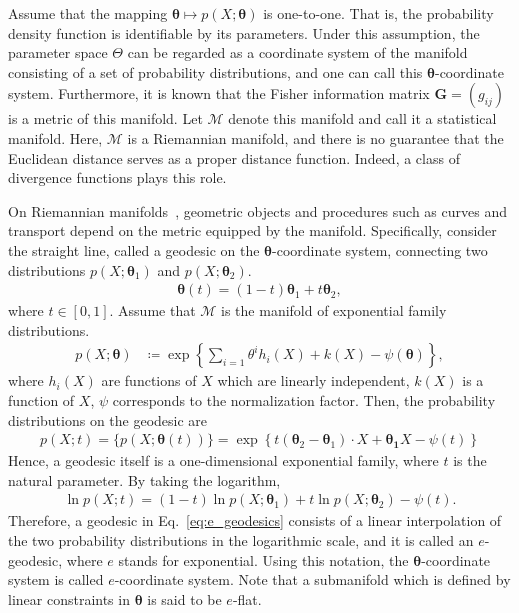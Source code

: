 \documentclass[12pt]{article}
\begin{document}
Assume that the mapping $\bm{\theta} \mapsto p(X; \bm{\theta})$ is one-to-one.
That is, the probability density function is identifiable by its parameters.
Under this assumption, the parameter space $\Theta$ can be regarded as a coordinate system of the manifold consisting of a set of probability distributions, and one can call this $\bm{\theta}$-coordinate system.
Furthermore, it is known that the Fisher information matrix $\bm{G} = (g_{ij})$ is a metric of this manifold.
Let $\mathcal{M}$ denote this manifold and call it a statistical manifold.
Here, $\mathcal{M}$ is a Riemannian manifold, and there is no guarantee that the Euclidean distance serves as a proper distance function.
Indeed, a class of divergence functions plays this role.

On Riemannian manifolds~\citep{lee2018introduction,lang1995differential}, geometric objects and procedures such as curves and transport depend on the metric equipped by the manifold.
Specifically, consider the straight line, called a geodesic on the $\bm{\theta}$-coordinate system, connecting two distributions $p(X; \bm{\theta}_1)$ and $p(X; \bm{\theta}_2)$.
\begin{align}
    \bm{\theta}(t) = (1 - t)\bm{\theta}_1 + t \bm{\theta}_2, \label{eq:e_geodesics}
\end{align}
where $t \in [0, 1]$.
Assume that $\mathcal{M}$ is the manifold of exponential family distributions.
\begin{align*}
    p(X; \bm{\theta}) &\coloneqq \exp\left\{\sum_{i=1}\theta^i h_i(X) + k(X) - \psi(\bm{\theta}) \right\},
\end{align*}
where $h_i(X)$ are functions of $X$ which are linearly independent, $k(X)$ is a function of $X$, $\psi$ corresponds to the normalization factor.
Then, the probability distributions on the geodesic are
\begin{align*}
    p(X; t) = \{p(X; \bm{\theta}(t))\} = \exp\left\{t(\bm{\theta}_2 - \bm{\theta}_1)\cdot X + \bm{\theta_1} X - \psi(t) \right\}
\end{align*}
Hence, a geodesic itself is a one-dimensional exponential family, where $t$ is the natural parameter.
By taking the logarithm,
\begin{align*}
    \ln p(X; t) = (1 - t) \ln p(X; \bm{\theta}_1) + t \ln p(X; \bm{\theta}_2) - \psi(t).
\end{align*}
Therefore, a geodesic in Eq.~\eqref{eq:e_geodesics} consists of a linear interpolation of the two probability distributions in the logarithmic scale, and it is called an $e$-geodesic, where $e$ stands for exponential.
Using this notation, the $\bm{\theta}$-coordinate system is called $e$-coordinate system.
Note that a submanifold which is defined by linear constraints in $\bm{\theta}$ is said to be $e$-flat.
\end{document}
